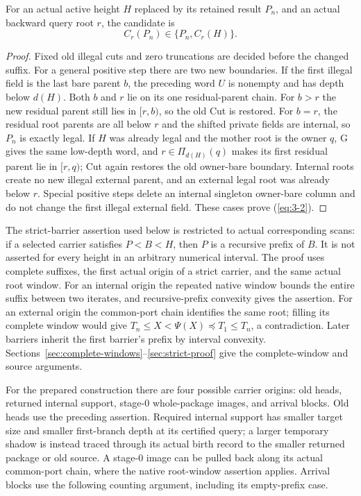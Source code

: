 \begin{lemma}\label{lem:menu}
For an actual active height $H$ replaced by its retained result $P_n$,
and an actual backward query root $r$, the candidate is
\begin{equation}\label{eq:3-2}
                    C_r(P_n)\in\{P_n,C_r(H)\}.             
\end{equation}
\end{lemma}
\begin{proof}
Fixed old illegal cuts and zero truncations are decided before the
changed suffix. For a general positive step there are two new
boundaries. If the first illegal field is the last bare parent $b$,
the preceding word $U$ is nonempty and has depth below $d(H)$.
Both $b$ and $r$ lie on its one residual-parent chain. For $b>r$ the
new residual parent still lies in $[r,b)$, so the old Cut is restored.
For $b=r$, the residual root parents are all below $r$ and the shifted
private fields are internal, so $P_n$ is exactly legal. If $H$ was
already legal and the mother root is the owner $q$, G gives the same
low-depth word, and $r\in\Pi_{d(H)}(q)$ makes its first residual parent
lie in $[r,q)$; Cut again restores the old owner-bare boundary.
Internal roots create no new illegal external parent, and an external
legal root was already below $r$. Special positive steps delete an
internal singleton owner-bare column and do not change the first
illegal external field. These cases prove (\ref{eq:3-2}). 
\end{proof}

The strict-barrier assertion used below is restricted to actual
corresponding scans: if a selected carrier satisfies $P<B<H$, then
$P$ is a recursive prefix of $B$. It is not asserted for every height
in an arbitrary numerical interval. The proof uses complete suffixes,
the first actual origin of a strict carrier, and the same actual root
window. For an internal origin the repeated native window bounds the
entire suffix between two iterates, and recursive-prefix convexity
gives the assertion. For an external origin the common-port chain
identifies the same root; filling its complete window would give
$T_n\le X<\Psi(X)\preceq T_1\le T_n$, a contradiction. Later barriers
inherit the first barrier's prefix by interval convexity. Sections~\ref{sec:complete-windows}--\ref{sec:strict-proof} give
the complete-window and source arguments.



For the prepared construction there are four possible carrier origins:
old heads, returned internal support, stage-0 whole-package images,
and arrival blocks. Old heads use the preceding assertion. Required
internal support has smaller target size and smaller first-branch
depth at its certified query; a larger temporary shadow is instead
traced through its actual birth record to the smaller returned package
or old source. A stage-0 image can be pulled back along its actual
common-port chain, where the native root-window assertion applies.
Arrival blocks use the following counting argument, including its
empty-prefix case.

